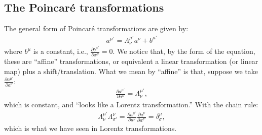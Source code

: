 \documentclass{book}
\theoremstyle{definition}
\begin{document}
\subsection{The Poincar\'e transformations}
The general form of Poincar\'e transformations are given by:
\begin{align*}
\boxed{a^{\mu'} = \Lambda^{\mu'}_\nu a^{\nu} + b^{\mu'}}
\end{align*}
where $b^{\mu}$ is a constant, i.e., $\frac{\partial b^{\mu'}}{\partial x^\nu} = 0$. We notice that, by the form of the equation, these are ``affine'' transformations, or equivalent a linear transformation (or linear map) plus a shift/translation. What we mean by ``affine'' is that, suppose we take $\frac{\partial a^{\mu'}}{\partial a^\nu}$:
\begin{align*}
\frac{\partial a^{\mu'}}{\partial a^\nu} = \Lambda^{\mu'}_\nu,
\end{align*}
which is constant, and ``looks like a Lorentz transformation.'' With the chain rule:
\begin{align*}
\Lambda^{\mu'}_\nu \Lambda^\nu_{\sigma'} = \frac{\partial a^{\mu'}}{\partial a^\nu}\frac{\partial a^{\nu}}{\partial a^{\sigma'}} = \delta^{\mu}_\sigma,
\end{align*}
which is what we have seen in Lorentz transformations.\\
\end{document}
